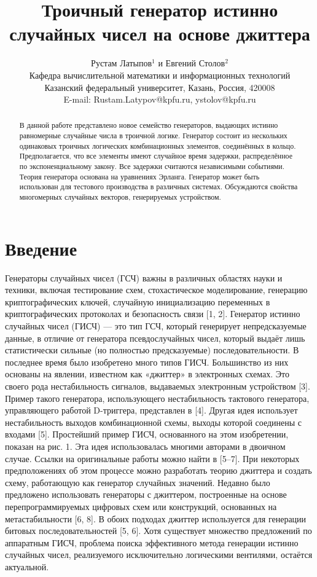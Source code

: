 \documentclass[a4paper,12pt]{article}
\title{Троичный генератор истинно случайных чисел на основе джиттера}
\author{Рустам Латыпов$^{1}$ и Евгений Столов$^{2}$ \\
  Кафедра вычислительной математики и информационных технологий \\
  Казанский федеральный университет, Казань, Россия, 420008 \\
  E-mail: Rustam.Latypov@kpfu.ru, ystolov@kpfu.ru}
\date{}
\begin{document}
\maketitle

\begin{abstract}
В данной работе представлено новое семейство генераторов, выдающих истинно равномерные случайные числа в троичной логике. Генератор состоит из нескольких одинаковых троичных логических комбинационных элементов, соединённых в кольцо. Предполагается, что все элементы имеют случайное время задержки, распределённое по экспоненциальному закону. Все задержки считаются независимыми событиями. Теория генератора основана на уравнениях Эрланга. Генератор может быть использован для тестового производства в различных системах. Обсуждаются свойства многомерных случайных векторов, генерируемых устройством.
\end{abstract}

\section{Введение}

Генераторы случайных чисел (ГСЧ) важны в различных областях науки и техники, включая тестирование схем, стохастическое моделирование, генерацию криптографических ключей, случайную инициализацию переменных в криптографических протоколах и безопасность связи [1, 2]. Генератор истинно случайных чисел (ГИСЧ) — это тип ГСЧ, который генерирует непредсказуемые данные, в отличие от генератора псевдослучайных чисел, который выдаёт лишь статистически сильные (но полностью предсказуемые) последовательности. В последнее время было изобретено много типов ГИСЧ. Большинство из них основаны на явлении, известном как «джиттер» в электронных схемах. Это своего рода нестабильность сигналов, выдаваемых электронным устройством [3]. Пример такого генератора, использующего нестабильность тактового генератора, управляющего работой D-триггера, представлен в [4]. Другая идея использует нестабильность выходов комбинационной схемы, выходы которой соединены с входами [5]. Простейший пример ГИСЧ, основанного на этом изобретении, показан на рис. 1. Эта идея использовалась многими авторами в двоичном случае. Ссылки на оригинальные работы можно найти в [5–7]. При некоторых предположениях об этом процессе можно разработать теорию джиттера и создать схему, работающую как генератор случайных значений. Недавно было предложено использовать генераторы с джиттером, построенные на основе перепрограммируемых цифровых схем или конструкций, основанных на метастабильности [6, 8]. В обоих подходах джиттер используется для генерации битовых последовательностей [5, 6]. Хотя существует множество предложений по аппаратным ГИСЧ, проблема поиска эффективного метода генерации истинно случайных чисел, реализуемого исключительно логическими вентилями, остаётся актуальной.
\end{document}
